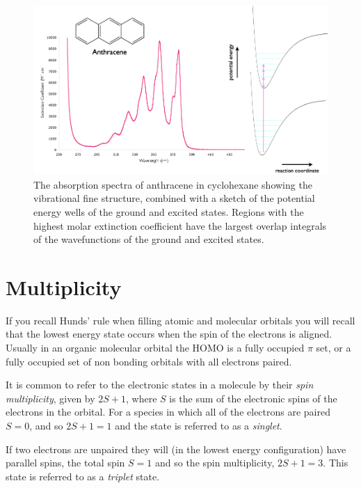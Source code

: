 \documentclass[
]{book}
\begin{document}
\begin{figure}

{\centering \includegraphics[width=0.9\linewidth]{images/Anthracene} 

}

\caption{The absorption spectra of anthracene in cyclohexane showing the vibrational fine structure, combined with a sketch of the potential energy wells of the ground and excited states. Regions with the highest molar extinction coefficient have the largest overlap integrals of the wavefunctions of the ground and excited states. }\label{fig:Anthracene}
\end{figure}

\hypertarget{sec:multiplicity}{%
\section{Multiplicity}\label{sec:multiplicity}}

If you recall Hunds' rule when filling atomic and molecular orbitals you will recall that the lowest energy state occurs when the spin of the electrons is aligned. Usually in an organic molecular orbital the HOMO is a fully occupied \(\pi\) set, or a fully occupied set of non bonding orbitals with all electrons paired.

It is common to refer to the electronic states in a molecule by their \emph{spin multiplicity}, given by \(2S+1\), where \(S\) is the sum of the electronic spins of the electrons in the orbital. For a species in which all of the electrons are paired \(S = 0\), and so \(2S+1 = 1\) and the state is referred to as a \emph{singlet}.

If two electrons are unpaired they will (in the lowest energy configuration) have parallel spins, the total spin \(S = 1\) and so the spin multiplicity, \(2S + 1 = 3\). This state is referred to as a \emph{triplet} state.
\end{document}
